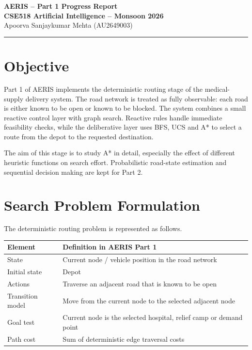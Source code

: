 \documentclass[11pt,a4paper]{article}
\begin{document}
\begin{center}
    {\Large \textbf{AERIS -- Part 1 Progress Report}}\\[4pt]
    \textbf{CSE518 Artificial Intelligence -- Monsoon 2026}\\[6pt]
    Apoorva Sanjaykumar Mehta (AU2649003)
\end{center}

\hrule
\vspace{0.7em}

\section{Objective}
Part 1 of AERIS implements the deterministic routing stage of the medical-supply delivery system. The road network is treated as fully observable: each road is either known to be open or known to be blocked. The system combines a small reactive control layer with graph search. Reactive rules handle immediate feasibility checks, while the deliberative layer uses BFS, UCS and A* to select a route from the depot to the requested destination.

The aim of this stage is to study A* in detail, especially the effect of different heuristic functions on search effort. Probabilistic road-state estimation and sequential decision making are kept for Part 2.

\section{Search Problem Formulation}
The deterministic routing problem is represented as follows.

\begin{center}
\begin{tabular}{>{\raggedright\arraybackslash}p{} p{}}
\toprule
\textbf{Element} & \textbf{Definition in AERIS Part 1} \\
\midrule
State & Current node / vehicle position in the road network \\
Initial state & Depot \\
Actions & Traverse an adjacent road that is known to be open \\
Transition model & Move from the current node to the selected adjacent node \\
Goal test & Current node is the selected hospital, relief camp or demand point \\
Path cost & Sum of deterministic edge traversal costs \\
\bottomrule
\end{tabular}
\end{center}
\end{document}
